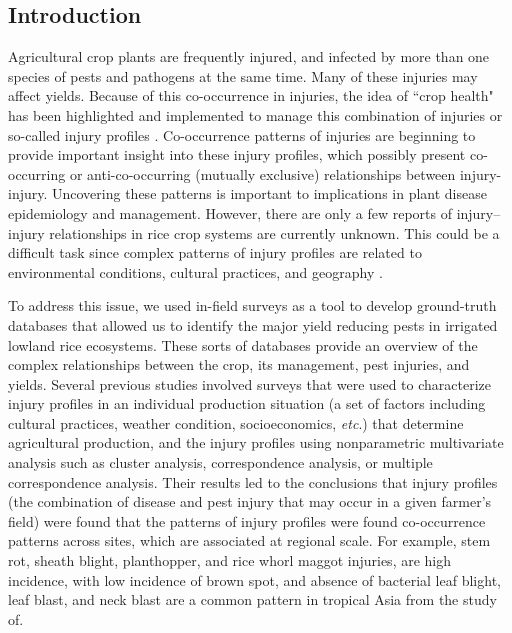 \subsection{Introduction}

Agricultural crop plants are frequently injured, and infected by more than one species of pests and pathogens at the same time. Many of these injuries may affect yields. Because of this co-occurrence in injuries, the idea of ``crop health" has been highlighted and implemented to manage this combination of injuries or so-called injury profiles \citep{Savary_2006}. Co-occurrence patterns of injuries are beginning to provide important insight into these injury profiles, which possibly present co-occurring or anti-co-occurring (mutually exclusive) relationships between injury-injury. Uncovering these patterns is important to implications in plant disease epidemiology and management. However, there are only a few reports of injury–injury relationships in rice crop systems are currently unknown. This could be a difficult task since complex patterns of injury profiles are related to environmental conditions, cultural practices, and geography \citep{Willocquet_2008_Simulating}.

To address this issue, we used in-field surveys as a tool to develop ground-truth databases that allowed us to identify the major yield reducing pests in irrigated lowland rice ecosystems. These sorts of databases provide an overview of the complex relationships between the crop, its management, pest injuries, and yields. Several previous studies \cite{Savary_2000_Characterization,Savary_2000_Quantification,Dong_2010_Characterization,Reddy_2011_Characterizing} involved surveys that were used to characterize injury profiles in an individual production situation (a set of factors including cultural practices, weather condition, socioeconomics, \textit{etc}.) that determine agricultural production, and the injury profiles using nonparametric multivariate analysis such as cluster analysis, correspondence analysis, or multiple correspondence analysis. Their results led to the conclusions that injury profiles (the combination of disease and pest injury that may occur in a given farmer’s field) were found that the patterns of injury profiles were found co-occurrence patterns across sites, which are associated at regional scale. For example, stem rot, sheath blight, planthopper, and rice whorl maggot injuries, are high incidence, with low incidence of brown spot, and absence of bacterial leaf blight, leaf blast, and neck blast are a common pattern in tropical Asia from the study of\citet{Savary_2000_Characterization}.

